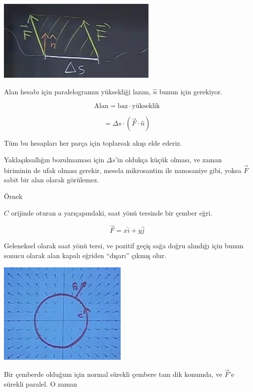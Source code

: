 \documentclass[12pt,fleqn]{article}\usepackage{../../common}
\begin{document}
\begin{center}

\includegraphics[height=4cm]{23_5.png}

\end{center}
Alan hesabı için paralelogramın yüksekliği lazım, $\hat{n}$ bunun için
gerekiyor. 

$$ \textrm{Alan}  = \textrm{baz} \cdot \textrm{yükseklik} $$

$$ = \Delta s \cdot (\vec{F} \cdot \hat{n} )$$

Tüm bu hesapları her parça için toplarsak akışı elde ederiz. 

Yaklaşıksallığın bozulmaması için $\Delta s$'in oldukça küçük olması, ve
zaman biriminin de ufak olması gerekir, mesela mikrosantim ile nanosaniye
gibi, yoksa $\vec{F}$ sabit bir alan olarak görülemez. 

Örnek

$C$ orijinde oturan $a$ yarıçapındaki, saat yönü tersinde bir çember eğri. 

$$ \vec{F} = x\hat{i} + y\hat{j} $$

Geleneksel olarak saat yönü tersi, ve pozitif geçiş sağa doğru alındığı
için bunun sonucu olarak alan kapalı eğriden ``dışarı'' çıkmış olur. 

\begin{center}

\includegraphics[height=5cm]{23_6.png}

\end{center}
Bir çemberde olduğum için normal sürekli çembere tam dik konumda, ve
$\vec{F}$'e sürekli paralel. O zaman 
\end{document}
